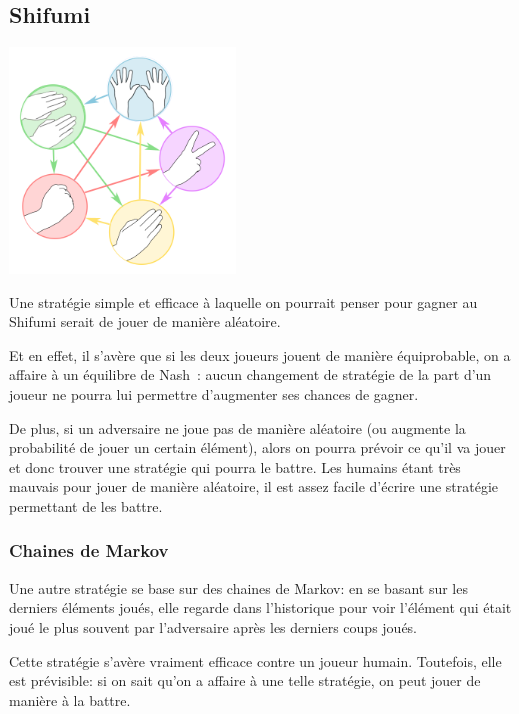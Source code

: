 \subsection{Shifumi}

    \begin{center}\includegraphics[width=6cm]{shifumi.png}\end{center}

    Une stratégie simple et efficace à laquelle on pourrait penser pour gagner
    au Shifumi serait de jouer de manière aléatoire.

    Et en effet, il s'avère que si les deux joueurs jouent de manière équiprobable,
    on a affaire à un équilibre de Nash~: aucun changement de stratégie de la part
    d'un joueur ne pourra lui permettre d'augmenter ses chances de gagner.

    De plus, si un adversaire ne joue pas de manière aléatoire (ou augmente la
    probabilité de jouer un certain élément), alors on pourra prévoir ce qu'il
    va jouer et donc trouver une stratégie qui pourra le battre. Les humains
    étant très mauvais pour jouer de manière aléatoire, il est assez facile
    d'écrire une stratégie permettant de les battre.

  \subsubsection{Chaines de Markov}
    Une autre stratégie se base sur des chaines de Markov: en se basant sur les
    derniers éléments joués, elle regarde dans l'historique pour voir l'élément
    qui était joué le plus souvent par l'adversaire après les derniers coups
    joués.

    Cette stratégie s'avère vraiment efficace contre un joueur humain.
    Toutefois, elle est prévisible: si on sait qu'on a affaire à une telle
    stratégie, on peut jouer de manière à la battre.

